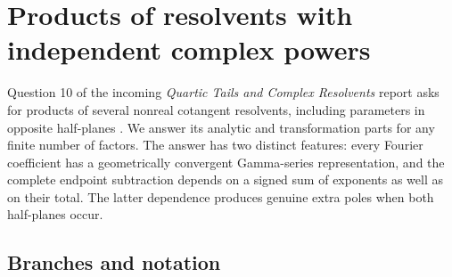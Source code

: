 \section{Products of resolvents with independent complex powers}
\label{mr:section}

Question 10 of the incoming \emph{Quartic Tails and Complex Resolvents}
report asks for products of several nonreal cotangent resolvents, including
parameters in opposite half-planes \cite{repo:quartic}. We answer its
analytic and transformation parts for any finite number of factors.
The answer has two distinct features: every Fourier coefficient has a
geometrically convergent Gamma-series representation, and the complete
endpoint subtraction depends on a signed sum of exponents as well as on
their total. The latter dependence produces genuine extra poles when both
half-planes occur.

\subsection{Branches and notation}

